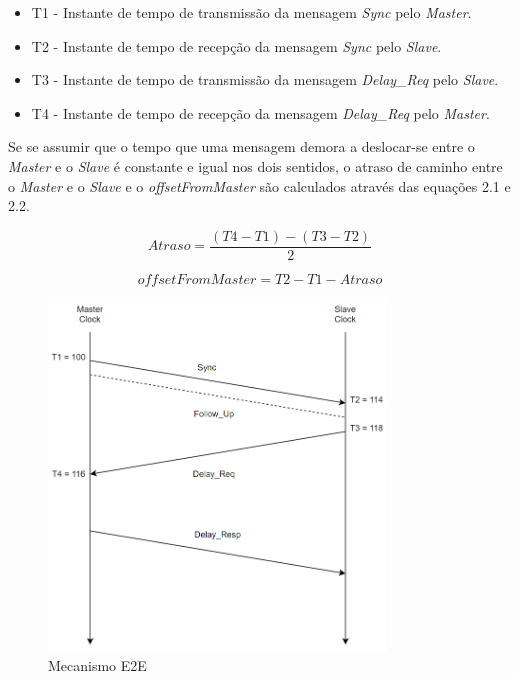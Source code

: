 \begin{itemize}
  \item T1  - \quad Instante de tempo de transmissão da mensagem \textit{Sync} pelo \textit{Master}.
  \item T2  - \quad Instante de tempo de recepção da mensagem \textit{Sync} pelo \textit{Slave}. 
  \item T3  - \quad Instante de tempo de transmissão da mensagem \textit{Delay\_Req} pelo \textit{Slave}.
  \item T4 - \quad Instante de tempo de recepção da mensagem \textit{Delay\_Req} pelo \textit{Master}.
\end{itemize}

Se se assumir que o tempo que uma mensagem demora a deslocar-se entre o \textit{Master} e o \textit{Slave} é constante e igual nos dois sentidos, o atraso de caminho entre o \textit{Master} e o \textit{Slave} e o \textit{offsetFromMaster} são calculados através das equações 2.1 e 2.2.

\begin{equation}
 Atraso =  \dfrac{(T4 - T1) - (T3 - T2)}{2}   
\end{equation}
 
\begin{equation}
   offsetFromMaster =  T2 - T1 - Atraso   
\end{equation}



\begin{figure}[!htb]
  \centering
  \includegraphics[width=0.8\textwidth]{First.png}
  \caption[Mecanismo E2E]{Mecanismo E2E}
  \label{fig:airbus1}
\end{figure}


